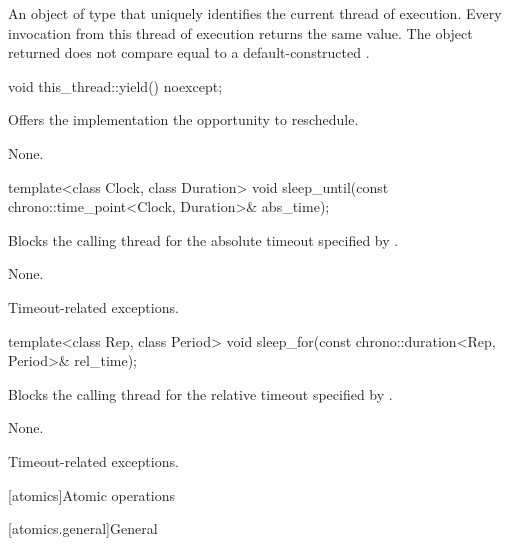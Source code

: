 \begin{itemdescr}
\pnum
\returns
An object of type 
that uniquely identifies the current thread of execution.
Every invocation from this thread of execution returns the same value.
The object returned does not compare equal to
a default-constructed .
\end{itemdescr}

%
\begin{itemdecl}
void this_thread::yield() noexcept;
\end{itemdecl}

\begin{itemdescr}
\pnum
\effects
Offers the implementation the opportunity to reschedule.

\pnum
\sync
None.
\end{itemdescr}

%
\begin{itemdecl}
template<class Clock, class Duration>
  void sleep_until(const chrono::time_point<Clock, Duration>& abs_time);
\end{itemdecl}

\begin{itemdescr}
\pnum
{}%
\effects
Blocks the calling thread for the absolute timeout specified
by .

\pnum
\sync
None.

\pnum
\throws
Timeout-related exceptions.
\end{itemdescr}

%
\begin{itemdecl}
template<class Rep, class Period>
  void sleep_for(const chrono::duration<Rep, Period>& rel_time);
\end{itemdecl}

\begin{itemdescr}
\pnum
{}%
\effects
Blocks the calling thread for the relative timeout specified
by .

\pnum
\sync
None.

\pnum
\throws
Timeout-related exceptions.
\end{itemdescr}

[atomics]{Atomic operations}

[atomics.general]{General}

